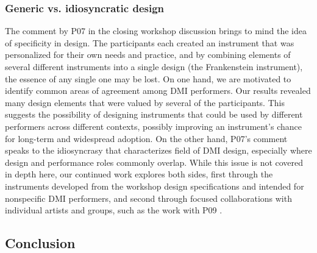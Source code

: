 \documentclass[letterpaper, 12pt]{article}
\begin{document}

\subsubsection{Generic vs. idiosyncratic design}
\label{ch3-sec:generic-vs-idiosyncratic-design}

The comment by P07 in the closing workshop discussion brings to mind the idea of specificity in design. The participants each created an instrument that was personalized for their own needs and practice, and by combining elements of several different instruments into a single design (the Frankenstein instrument), the essence of any single one may be lost. On one hand, we are motivated to identify common areas of agreement among DMI performers. Our results revealed many design elements that were valued by several of the participants. This suggests the possibility of designing instruments that could be used by different performers across different contexts, possibly improving an instrument's chance for long-term and widespread adoption. On the other hand, P07's comment speaks to the idiosyncrasy that characterizes field of DMI design, especially where design and performance roles commonly overlap. While this issue is not covered in depth here, our continued work explores both sides, first through the instruments developed from the workshop design specifications and intended for nonspecific DMI performers, and second through focused collaborations with individual artists and groups, such as the work with P09 \citep{Sullivan2018}. 

\subsection{Conclusion}
\label{ch3-sec:conclusion}
\end{document}
